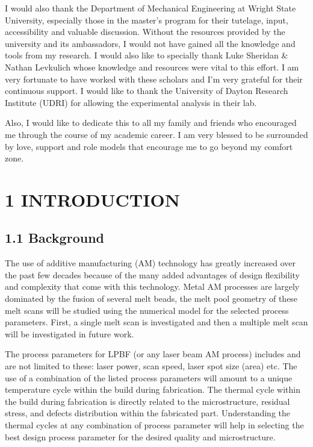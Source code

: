 \documentclass[10pt]{article}
\begin{document}
I would also thank the Department of Mechanical Engineering at Wright State University, especially those in the master's program for their tutelage, input, accessibility and valuable discussion. Without the resources provided by the university and its ambassadors, I would not have gained all the knowledge and tools from my research. I would also like to specially thank Luke Sheridan \& Nathan Levkulich whose knowledge and resources were vital to this effort. I am very fortunate to have worked with these scholars and I'm very grateful for their continuous support. I would like to thank the University of Dayton Research Institute (UDRI) for allowing the experimental analysis in their lab.

Also, I would like to dedicate this to all my family and friends who encouraged me through the course of my academic career. I am very blessed to be surrounded by love, support and role models that encourage me to go beyond my comfort zone.

\section*{1 INTRODUCTION}
\subsection*{1.1 Background}
The use of additive manufacturing (AM) technology has greatly increased over the past few decades because of the many added advantages of design flexibility and complexity that come with this technology. Metal AM processes are largely dominated by the fusion of several melt beads, the melt pool geometry of these melt scans will be studied using the numerical model for the selected process parameters. First, a single melt scan is investigated and then a multiple melt scan will be investigated in future work.

The process parameters for LPBF (or any laser beam AM process) includes and are not limited to these: laser power, scan speed, laser spot size (area) etc. The use of a combination of the listed process parameters will amount to a unique temperature cycle within the build during fabrication. The thermal cycle within the build during fabrication is directly related to the microstructure, residual stress, and defects distribution within the fabricated part. Understanding the thermal cycles at any combination of process parameter will help in selecting the best design process parameter for the desired quality and microstructure.
\end{document}
